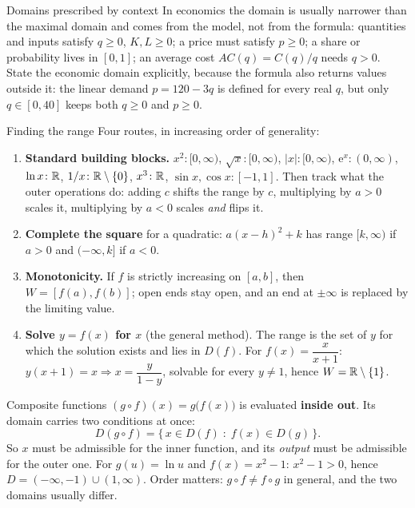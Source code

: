 \begin{rulebox}{Domains prescribed by context}
In economics the domain is usually narrower than the maximal domain and
comes from the model, not from the formula:
quantities and inputs satisfy $q\geq 0$, $K,L\geq 0$; a price must satisfy
$p\geq 0$; a share or probability lives in $[0,1]$; an average cost
$AC(q)=C(q)/q$ needs $q>0$. State the economic domain explicitly, because
the formula also returns values outside it: the linear demand
$p=120-3q$ is defined for every real $q$, but only $q\in[0,40]$ keeps both
$q\geq0$ and $p\geq 0$.
\end{rulebox}

\begin{rulebox}{Finding the range}
Four routes, in increasing order of generality:
\begin{enumerate}[leftmargin=1.7em,itemsep=0.3ex]
  \item \textbf{Standard building blocks.}
        $x^{2}\colon[0,\infty)$, \;$\sqrt{x}\colon[0,\infty)$,
        \;$|x|\colon[0,\infty)$, \;$\mathrm{e}^{x}\colon(0,\infty)$,
        \;$\ln x\colon\mathbb{R}$, \;$1/x\colon\mathbb{R}\setminus\{0\}$,
        \;$x^{3}\colon\mathbb{R}$, \;$\sin x,\cos x\colon[-1,1]$.
        Then track what the outer operations do: adding $c$ shifts the
        range by $c$, multiplying by $a>0$ scales it, multiplying by $a<0$
        scales \emph{and} flips it.
  \item \textbf{Complete the square} for a quadratic:
        $a(x-h)^{2}+k$ has range $[k,\infty)$ if $a>0$ and
        $(-\infty,k]$ if $a<0$.
  \item \textbf{Monotonicity.} If $f$ is strictly increasing on $[a,b]$,
        then $W=[f(a),f(b)]$; open ends stay open, and an end at
        $\pm\infty$ is replaced by the limiting value.
  \item \textbf{Solve $y=f(x)$ for $x$} (the general method). The range is
        the set of $y$ for which the solution exists and lies in $D(f)$.
        For $f(x)=\dfrac{x}{x+1}$: \;$y(x+1)=x\Rightarrow x=\dfrac{y}{1-y}$,
        solvable for every $y\neq 1$, hence $W=\mathbb{R}\setminus\{1\}$.
\end{enumerate}
\end{rulebox}

\begin{rulebox}{Composite functions}
$(g\circ f)(x)=g\bigl(f(x)\bigr)$ is evaluated \textbf{inside out}. Its
domain carries two conditions at once:
\[
  D(g\circ f)=\{\,x\in D(f)\;:\;f(x)\in D(g)\,\}.
\]
So $x$ must be admissible for the inner function, and its \emph{output}
must be admissible for the outer one. For $g(u)=\ln u$ and $f(x)=x^{2}-1$:
$x^{2}-1>0$, hence $D=(-\infty,-1)\cup(1,\infty)$. Order matters:
$g\circ f\neq f\circ g$ in general, and the two domains usually differ.
\end{rulebox}

